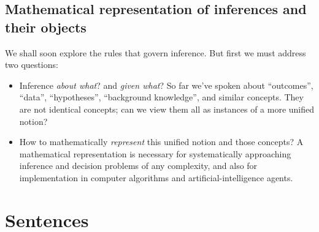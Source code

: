 \documentclass[
  a4paper,
  DIV=11,
  numbers=noendperiod,
  oneside]{scrreprt}
\begin{document}
\hypertarget{mathematical-representation-of-inferences-and-their-objects}{%
\section{Mathematical representation of inferences and their
objects}\label{mathematical-representation-of-inferences-and-their-objects}}

We shall soon explore the rules that govern inference. But first we must
address two questions:

\begin{itemize}
\item
  Inference \emph{about what}? and \emph{given what}? So far we've
  spoken about ``outcomes'', ``data'', ``hypotheses'', ``background
  knowledge'', and similar concepts. They are not identical concepts;
  can we view them all as instances of a more unified notion?
\item
  How to mathematically \emph{represent} this unified notion and those
  concepts? A mathematical representation is necessary for
  systematically approaching inference and decision problems of any
  complexity, and also for implementation in computer algorithms and
  artificial-intelligence agents.
\end{itemize}

\hypertarget{sentences}{%
\chapter{Sentences}\label{sentences}}

\providecommand{\ul}{\uline}
\renewcommand*{\|}[1][]{\nonscript\:#1\vert\nonscript\:\mathopen{}}
\providecommand*{\pr}[1]{\textsf{\small`#1'}}
\renewcommand*{\pr}[1]{\textsf{\small`#1'}}
\providecommand*{\prq}[1]{\textsf{\small #1}}
\renewcommand*{\prq}[1]{\textsf{\small #1}}
\providecommand{\se}[1]{\mathsfit{#1}}
\renewcommand{\se}[1]{\mathsfit{#1}}
\providecommand{\p}{\mathrm{p}}
\renewcommand{\p}{\mathrm{p}}
\renewcommand{\P}{\mathrm{P}}
\end{document}
